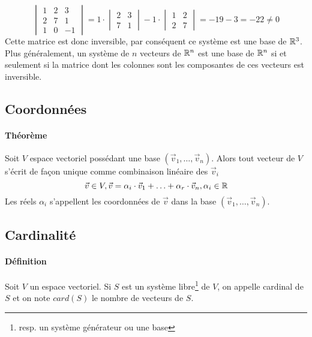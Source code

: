 $$\begin{vmatrix}
  1 & 2 & 3 \\
  2 & 7 & 1 \\
  1 & 0 & -1
\end{vmatrix}
=
1 \cdot 
\begin{vmatrix}
  2 & 3 \\
  7 & 1
\end{vmatrix}
-1 \cdot
\begin{vmatrix}
  1 & 2 \\
  2 & 7
\end{vmatrix}
= -19 -3 = -22 \neq 0$$
Cette matrice est donc inversible, par conséquent ce système est une base de $\mathbb{R}^3$. \\
Plus généralement, un système de $n$ vecteurs de $\mathbb{R}^n$ est une base de $\mathbb{R}^n$ si et seulement si la matrice dont les colonnes sont les composantes de ces vecteurs est inversible.

%
\subsection{Coordonnées}
%
\paragraph{Théorème} Soit $V$ espace vectoriel possédant une base $(\vec{v}_1, \ldots, \vec{v}_n)$. Alors tout vecteur de $V$ s'écrit de façon unique comme combinaison linéaire des $\vec{v}_i$
$$\vec{v} \in V, \vec{v}=\alpha_i \cdot \vec{v}_1 + \ldots + \alpha_r \cdot \vec{v}_n, \alpha_i \in \mathbb{R}$$
Les réels $\alpha_i$ s'appellent les coordonnées de $\vec{v}$ dans la base $(\vec{v}_1, \ldots, \vec{v}_n)$.


%
\subsection{Cardinalité}
%
\paragraph{Définition} Soit $V$ un espace vectoriel. Si $S$ est un système libre\footnote{resp. un système générateur ou une base} de $V$, on appelle cardinal de $S$ et on note $card(S)$ le nombre de vecteurs de $S$.

